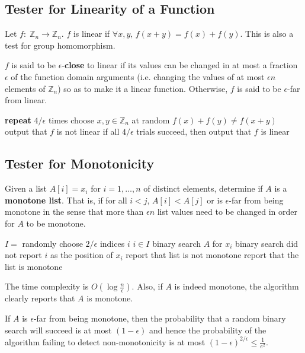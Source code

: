 \subsection{Tester for Linearity of a Function}

Let $f:\; \mathbb{Z}_n \to \mathbb{Z}_n$. $f$ is linear if $\forall x,y,\, f(x+y) = f(x) + f(y)$. This is also a test for group homomorphism.

$f$ is said to be $\epsilon$-\textbf{close} to linear if its values can be changed in at most a fraction $\epsilon$ of the function domain arguments (i.e. changing the values of at most $\epsilon n$ elements of $\mathbb{Z}_n$) so as to make it a linear function. Otherwise, $f$ is said to be $\epsilon$-far from linear.

\begin{codebox}
    \li \textbf{repeat} $4/\epsilon$ times \Do
        \li choose $x,y \in \mathbb{Z}_n$ at random
        \li \If $f(x) + f(y) \neq f(x+y)$ \Then
            \li output that $f$ is not linear
        \End
    \End
    \li if all $4/\epsilon$ trials succeed, then output that $f$ is linear
\end{codebox}

\subsection{Tester for Monotonicity}

Given a list $A[i] = x_i$ for $i = 1,\ldots,n$ of distinct elements, determine if $A$ is a \textbf{monotone list}. That is, if for all $i < j$, $A[i] < A[j]$ or is $\epsilon$-far from being monotone in the sense that more than $\epsilon n$ list values need to be changed in order for $A$ to be monotone.

\begin{codebox}
    \li $I = $ randomly choose $2 / \epsilon$ indices $i$
    \li \For $i \in I$
        \li binary search $A$ for $x_i$
        \li \If binary search did not report $i$ as the position of $x_i$ \Then
            \li report that list is not monotone
        \End
    \End
    \li report that the list is monotone
\end{codebox}

The time complexity is $O(\log \frac{n}{\epsilon})$. Also, if $A$ is indeed monotone, the algorithm clearly reports that $A$ is monotone.

If $A$ is $\epsilon$-far from being monotone, then the probability that a random binary search will succeed is at most $(1 - \epsilon)$ and hence the probability of the algorithm failing to detect non-monotonicity is at most $(1 - \epsilon)^{2 / \epsilon} \leq \frac{1}{e^2}$.

